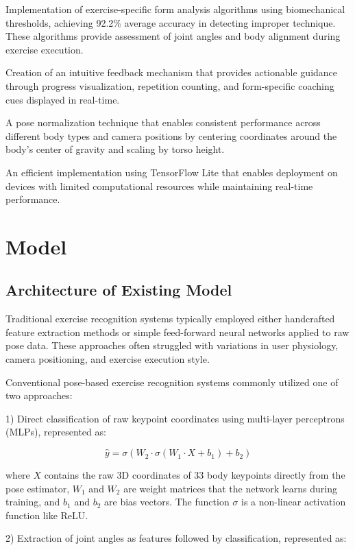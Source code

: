 \documentclass[11pt]{article}
\begin{document}
Implementation of exercise-specific form analysis algorithms using biomechanical thresholds, achieving 92.2\% average accuracy in detecting improper technique. These algorithms provide assessment of joint angles and body alignment during exercise execution.

Creation of an intuitive feedback mechanism that provides actionable guidance through progress visualization, repetition counting, and form-specific coaching cues displayed in real-time.

A pose normalization technique that enables consistent performance across different body types and camera positions by centering coordinates around the body's center of gravity and scaling by torso height.

An efficient implementation using TensorFlow Lite that enables deployment on devices with limited computational resources while maintaining real-time performance.

\section{Model}

\subsection{Architecture of Existing Model}
Traditional exercise recognition systems typically employed either handcrafted feature extraction methods or simple feed-forward neural networks applied to raw pose data. These approaches often struggled with variations in user physiology, camera positioning, and exercise execution style.

Conventional pose-based exercise recognition systems commonly utilized one of two approaches:

1) Direct classification of raw keypoint coordinates using multi-layer perceptrons (MLPs), represented as:

\begin{equation}
\hat{y} = \sigma(W_2 \cdot \sigma(W_1 \cdot X + b_1) + b_2)
\end{equation}

where $X$ contains the raw 3D coordinates of 33 body keypoints directly from the pose estimator, $W_1$ and $W_2$ are weight matrices that the network learns during training, and $b_1$ and $b_2$ are bias vectors. The function $\sigma$ is a non-linear activation function like ReLU.

2) Extraction of joint angles as features followed by classification, represented as:
\end{document}
